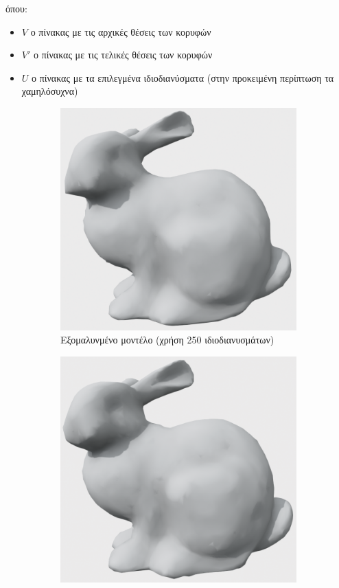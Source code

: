 \documentclass{article}
\begin{document}
όπου:
\begin{itemize}
	\item $V$ ο πίνακας με τις αρχικές θέσεις των κορυφών
	\item $V'$ ο πίνακας με τις τελικές θέσεις των κορυφών
	\item $U$ ο πίνακας με τα επιλεγμένα ιδιοδιανύσματα
		(στην προκειμένη περίπτωση τα χαμηλόσυχνα)
\end{itemize}

\begin{figure}[h]
	\centering
	\begin{subfigure}{0.4\textwidth}
		\includegraphics[width=\textwidth]{"250_eigs.png"}
		\caption{Εξομαλυνμένο μοντέλο (χρήση 250 ιδιοδιανυσμάτων)}
	\end{subfigure}
	\begin{subfigure}{0.4\textwidth}
		\includegraphics[width=\textwidth]{"1000_eigs.png"}

\end{subfigure}
\end{figure}
\end{document}
